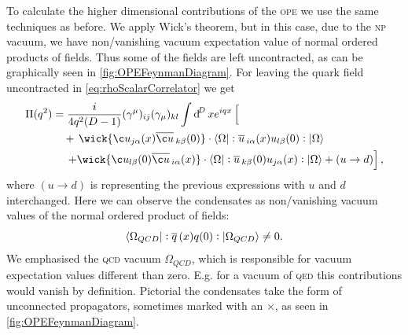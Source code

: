 \documentclass[../../index.tex]{subfiles}
\begin{document}
To calculate the higher dimensional contributions of the \textsc{ope} we use the
same techniques as before. We apply Wick's theorem, but in this case, due to the
\textsc{np} vacuum, we have non\-/vanishing vacuum expectation value of normal
ordered products of fields. Thus some of the fields are left uncontracted, as
can be graphically seen in \cref{fig:OPEFeynmanDiagram}. For leaving the quark
field uncontracted in \cref{eq:rhoScalarCorrelator} we get
\begin{equation}
  \begin{split}
    \Pi(q^2) &= \frac{i}{4q^2(D-1)} (\gamma^\mu)_{ij} (\gamma_\mu)_{kl} \int \dif^D x e^{iqx} \left[ \phantom{\wick{ \c u_{j \alpha}(x) \anti{\c u}_{k \beta}(0)}} \right.\\
    &\quad+\,\wick{ \c u_{j \alpha}(x) \anti{\c u}_{k \beta}(0)} \cdot \langle \Omega \vert : \anti{u}_{i \alpha}(x) u_{l \beta} (0) :\vert \Omega \rangle \\
    &\quad\,\left.+\wick{\c u_{l \beta}(0) \anti{\c u}_{i \alpha}(x)} \cdot
      \langle \Omega \vert: \anti{u}_{k \beta}(0) u_{j \alpha}(x) : \vert \Omega
      \rangle + (u \to d) \right],
  \end{split}
\end{equation}
where \((u\to d)\) is representing the previous expressions with \(u\) and \(d\)
interchanged. Here we can observe the condensates as non\-/vanishing vacuum
values of the normal ordered product of fields:
\begin{equation}
  \langle\Omega_{QCD}\vert: \overline{q}\,(x) q(0) :\vert\Omega_{QCD}\rangle \neq 0.
\end{equation}
We emphasised the \textsc{qcd} vacuum \(\Omega_{QCD}\), which is responsible for
vacuum expectation values different than zero. E.g. for a vacuum of \textsc{qed}
this contributions would vanish by definition. Pictorial the condensates take
the form of unconnected propagators, sometimes marked with an \(\times\), as seen in
\cref{fig:OPEFeynmanDiagram}.
\end{document}
